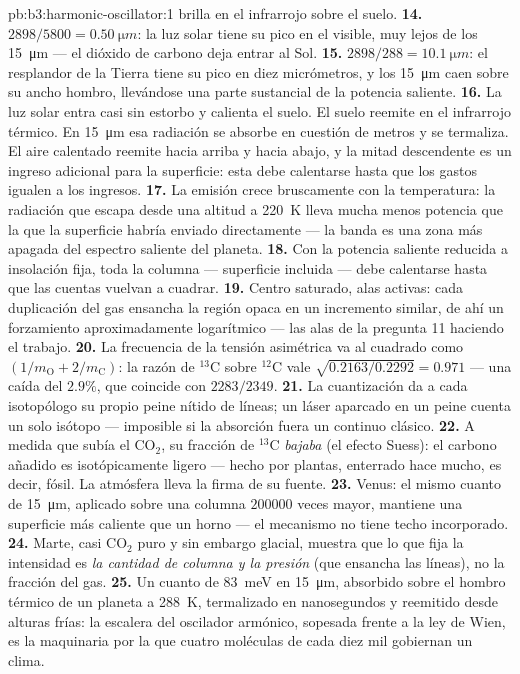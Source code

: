 \begin{solution}{pb:b3:harmonic-oscillator:1}
brilla en el infrarrojo sobre el suelo.
\textbf{14.} $2898/5800 = \qty{0.50}{\micro m}$: la luz solar tiene su pico
en el visible, muy lejos de los \qty{15}{\micro m} --- el dióxido de carbono
deja entrar al Sol.
\textbf{15.} $2898/288 = \qty{10.1}{\micro m}$: el resplandor de la Tierra
tiene su pico en diez micrómetros, y los \qty{15}{\micro m} caen sobre su
ancho hombro, llevándose una parte sustancial de la potencia saliente.
\textbf{16.} La luz solar entra casi sin estorbo y calienta el
suelo. El suelo reemite en el infrarrojo térmico. En
\qty{15}{\micro m} esa radiación se absorbe en cuestión de metros y se
termaliza. El aire calentado reemite hacia arriba y hacia abajo, y
la mitad descendente es un ingreso adicional para la superficie: esta debe
calentarse hasta que los gastos igualen a los ingresos.
\textbf{17.} La emisión crece bruscamente con la temperatura: la radiación
que escapa desde una altitud a \qty{220}{K} lleva mucha menos potencia que
la que la superficie habría enviado directamente --- la banda es una zona
más apagada del espectro saliente del planeta.
\textbf{18.} Con la potencia saliente reducida a insolación fija, toda la
columna --- superficie incluida --- debe calentarse hasta que las cuentas
vuelvan a cuadrar.
\textbf{19.} Centro saturado, alas activas: cada duplicación del gas
ensancha la región opaca en un incremento similar, de ahí un forzamiento
aproximadamente logarítmico --- las alas de la pregunta 11 haciendo el
trabajo.
\textbf{20.} La frecuencia de la tensión asimétrica va al cuadrado como $(1/m_{
\text{O}} + 2/m_{\text{C}})$: la razón de $^{13}$C sobre $^{12}$C
vale $\sqrt{0.2163/0.2292} = 0.971$ --- una caída del $2.9\%$, que coincide
con $2283/2349$.
\textbf{21.} La cuantización da a cada isotopólogo su propio peine nítido
de líneas; un láser aparcado en un peine cuenta un solo isótopo ---
imposible si la absorción fuera un continuo clásico.
\textbf{22.} A medida que subía el CO$_2$, su fracción de $^{13}$C
\emph{bajaba} (el efecto Suess): el carbono añadido es isotópicamente ligero
--- hecho por plantas, enterrado hace mucho, es decir, fósil. La atmósfera
lleva la firma de su fuente.
\textbf{23.} Venus: el mismo cuanto de \qty{15}{\micro m}, aplicado
sobre una columna $200000$ veces mayor, mantiene una superficie más caliente
que un horno --- el mecanismo no tiene techo incorporado.
\textbf{24.} Marte, casi CO$_2$ puro y sin embargo glacial, muestra que lo
que fija la intensidad es \emph{la cantidad de columna y la presión} (que
ensancha las líneas), no la fracción del gas.
\textbf{25.} Un cuanto de \qty{83}{meV} en \qty{15}{\micro m},
absorbido sobre el hombro térmico de un planeta a \qty{288}{K}, termalizado
en nanosegundos y reemitido desde alturas frías: la escalera del oscilador
armónico, sopesada frente a la ley de Wien, es la maquinaria por la que
cuatro moléculas de cada diez mil gobiernan un clima.
\end{solution}

